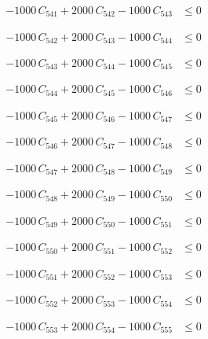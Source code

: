 \documentclass[a4paper,11pt]{article}
\begin{document}
\begin{align}
-1000\,C_{541} + 2000\,C_{542} - 1000\,C_{543} &\leq 0 \nonumber
\end{align}

\begin{align}
-1000\,C_{542} + 2000\,C_{543} - 1000\,C_{544} &\leq 0 \nonumber
\end{align}

\begin{align}
-1000\,C_{543} + 2000\,C_{544} - 1000\,C_{545} &\leq 0 \nonumber
\end{align}

\begin{align}
-1000\,C_{544} + 2000\,C_{545} - 1000\,C_{546} &\leq 0 \nonumber
\end{align}

\begin{align}
-1000\,C_{545} + 2000\,C_{546} - 1000\,C_{547} &\leq 0 \nonumber
\end{align}

\begin{align}
-1000\,C_{546} + 2000\,C_{547} - 1000\,C_{548} &\leq 0 \nonumber
\end{align}

\begin{align}
-1000\,C_{547} + 2000\,C_{548} - 1000\,C_{549} &\leq 0 \nonumber
\end{align}

\begin{align}
-1000\,C_{548} + 2000\,C_{549} - 1000\,C_{550} &\leq 0 \nonumber
\end{align}

\begin{align}
-1000\,C_{549} + 2000\,C_{550} - 1000\,C_{551} &\leq 0 \nonumber
\end{align}

\begin{align}
-1000\,C_{550} + 2000\,C_{551} - 1000\,C_{552} &\leq 0 \nonumber
\end{align}

\begin{align}
-1000\,C_{551} + 2000\,C_{552} - 1000\,C_{553} &\leq 0 \nonumber
\end{align}

\begin{align}
-1000\,C_{552} + 2000\,C_{553} - 1000\,C_{554} &\leq 0 \nonumber
\end{align}

\begin{align}
-1000\,C_{553} + 2000\,C_{554} - 1000\,C_{555} &\leq 0 \nonumber
\end{align}
\end{document}
